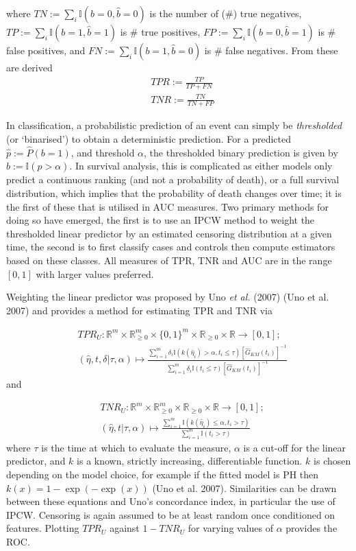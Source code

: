 \documentclass[
  letterpaper,
]{scrbook}
\theoremstyle{plain}
\theoremstyle{definition}
\theoremstyle{remark}
\begin{document}
where \(TN := \sum_i \mathbb{I}(b = 0, \hat{b}= 0)\) is the number of
(\#) true negatives, \(TP := \sum_i \mathbb{I}(b = 1, \hat{b}= 1)\) is
\# true positives, \(FP := \sum_i \mathbb{I}(b = 0, \hat{b}= 1)\) is \#
false positives, and \(FN := \sum_i \mathbb{I}(b = 1, \hat{b}= 0)\) is
\# false negatives. From these are derived \begin{align}
& TPR := \frac{TP}{TP + FN} \\
& TNR := \frac{TN}{TN + FP}
\end{align}

In classification, a probabilistic prediction of an event can simply be
\emph{thresholded} (or `binarised') to obtain a deterministic
prediction. For a predicted \(\hat{p} := \hat{P}(b = 1)\), and threshold
\(\alpha\), the thresholded binary prediction is given by
\(\hat{b} := \mathbb{I}(\hat{p} > \alpha)\). In survival analysis, this
is complicated as either models only predict a continuous ranking (and
not a probability of death), or a full survival distribution, which
implies that the probability of death changes over time; it is the first
of these that is utilised in AUC measures. Two primary methods for doing
so have emerged, the first is to use an IPCW method to weight the
thresholded linear predictor by an estimated censoring distribution at a
given time, the second is to first classify cases and controls then
compute estimators based on these classes. All measures of TPR, TNR and
AUC are in the range \([0,1]\) with larger values preferred.

Weighting the linear predictor was proposed by Uno
\textit{et al.} (2007) (Uno et al. 2007) and provides a method for
estimating TPR and TNR via

\[
\begin{split}
&TPR_U: \mathbb{R}^m \times \mathbb{R}_{\geq 0}^m \times \{0,1\}^m \times \mathbb{R}_{\geq 0}\times \mathbb{R}\rightarrow [0,1]; \\
&(\hat{\eta}, t, \delta | \tau, \alpha) \mapsto  \frac{\sum^m_{i=1} \delta_i \mathbb{I}(k(\hat{\eta}_i) > \alpha, t_i \leq \tau)[\hat{G}_{KM}(t_i)]^{-1}}{\sum^m_{i=1}\delta_i\mathbb{I}(t_i \leq \tau)[\hat{G}_{KM}(t_i)]^{-1}}
\end{split}
\] and

\[
\begin{split}
&TNR_U: \mathbb{R}^m \times \mathbb{R}_{\geq 0}^m \times \mathbb{R}_{\geq 0}\times \mathbb{R}\rightarrow [0,1]; \\
&(\hat{\eta}, t | \tau, \alpha) \mapsto \frac{\sum^m_{i=1} \mathbb{I}(k(\hat{\eta}_i) \leq \alpha, t_i > \tau)}{\sum^m_{i=1}\mathbb{I}(t_i > \tau)}
\end{split}
\] where \(\tau\) is the time at which to evaluate the measure,
\(\alpha\) is a cut-off for the linear predictor, and \(k\) is a known,
strictly increasing, differentiable function. \(k\) is chosen depending
on the model choice, for example if the fitted model is PH then
\(k(x) = 1 - \exp(-\exp(x))\) (Uno et al. 2007). Similarities can be
drawn between these equations and Uno's concordance index, in particular
the use of IPCW. Censoring is again assumed to be at least random once
conditioned on features. Plotting \(TPR_U\) against \(1 - TNR_U\) for
varying values of \(\alpha\) provides the ROC.
\end{document}
